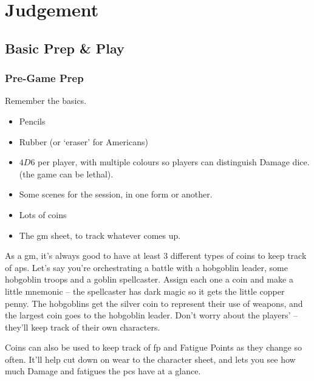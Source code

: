\chapter[Bastion of Judgement]{Judgement}
\label{judgement}

\section{Basic Prep \& Play}

\begin{multicols}{2}

\subsection{Pre-Game Prep}

Remember the basics.

\begin{itemize}
  \item
  Pencils
  \item
  Rubber (or `eraser' for Americans)
  \item
  $4D6$ per player, with multiple colours so players can distinguish Damage dice.
  \iftoggle{stories}{
    \item
    A boat-load of character sheets
  }{
    Some pre-made characters, including spares
  } (the game can be lethal).
  \item
  Some scenes for the session, in one form or another.
  \item
  Lots of coins
  \item
  The \gls{gm} sheet, to track whatever comes up.
\end{itemize}

As a \gls{gm}, it's always good to have at least 3 different types of coins to keep track of \glspl{ap}.
Let's say you're orchestrating a battle with a hobgoblin leader, some hobgoblin troops and a goblin spellcaster.
Assign each one a coin and make a little mnemonic -- the spellcaster has dark magic so it gets the little copper penny.
The hobgoblins get the silver coin to represent their use of weapons, and the largest coin goes to the hobgoblin leader.
Don't worry about the players'  -- they'll keep track of their own characters.

Coins can also be used to keep track of \gls{fp} and Fatigue Points as they change so often.
It'll help cut down on wear to the character sheet, and lets you see how much Damage and \glspl{fatigue} the \glspl{pc} have at a glance.


\end{multicols}
